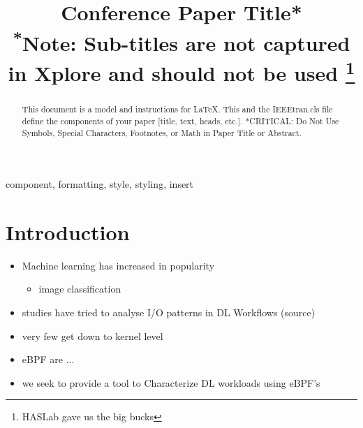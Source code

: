 \documentclass[conference]{IEEEtran}
\begin{document}
\title{Conference Paper Title*\\
{\footnotesize \textsuperscript{*}Note: Sub-titles are not captured in Xplore and
should not be used}
\thanks{HASLab gave us the big bucks}
}

\author{
    \and
    \and
}

\maketitle

\begin{abstract}
    This document is a model and instructions for \LaTeX.
    This and the IEEEtran.cls file define the components of your paper [title, text, heads, etc.]. *CRITICAL: Do Not Use Symbols, Special Characters, Footnotes,
    or Math in Paper Title or Abstract.
\end{abstract}

\begin{IEEEkeywords}
    component, formatting, style, styling, insert
\end{IEEEkeywords}

\section{Introduction}
\begin{itemize}
    \item Machine learning has increased in popularity
    \begin{itemize}
        \item image classification
    \end{itemize}
    \item studies have tried to analyse I/O patterns in DL Workflows (source)
    \item very few get down to kernel level
    \item eBPF are ...
    \item we seek to provide a tool to Characterize DL workloads using eBPF's
\end{itemize}
\end{document}
